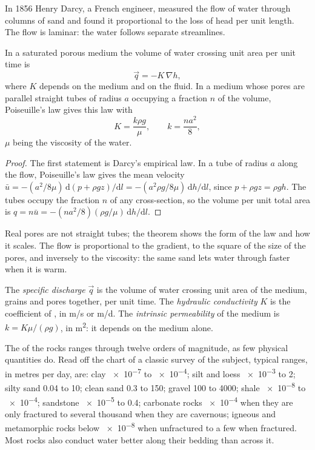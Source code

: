 In 1856 Henry Darcy, a French engineer, measured the flow of water through
columns of sand and found it proportional to the loss of head per unit
length. The flow is laminar: the water follows separate streamlines.

\begin{theorem}\label{thm:b3:hydrogeology:darcy}
In a saturated porous medium the volume of water crossing unit area per
unit time is
\[
\vec q = -K\,\nabla h ,
\]
where $K$ depends on the medium and on the fluid. In a medium whose pores
are parallel straight tubes of radius $a$ occupying a fraction $n$ of the
volume, Poiseuille's law gives this law with
\[
K = \frac{k\rho g}{\mu}, \qquad k = \frac{na^2}{8} ,
\]
$\mu$ being the viscosity of the water.
\end{theorem}

\begin{proof}
The first statement is Darcy's empirical law. In a tube of radius $a$
along the flow, Poiseuille's law gives the mean velocity $\bar u =
-(a^2/8\mu)\,\mathrm d(p + \rho gz)/\mathrm dl = -(a^2\rho g/8\mu)\,\mathrm
dh/\mathrm dl$, since $p + \rho gz = \rho g h$. The tubes occupy the
fraction $n$ of any cross-section, so the volume per unit total area is
$q = n\bar u = -(na^2/8)(\rho g/\mu)\,\mathrm dh/\mathrm dl$.
\end{proof}

Real pores are not straight tubes; the theorem shows the form of the law
and how it scales. The flow is proportional to the gradient, to the square
of the size of the pores, and inversely to the viscosity: the same sand
lets water through faster when it is warm.

\begin{definition}\label{def:b3:hydrogeology:darcy}
The \emph{specific discharge} $\vec q$ is the
volume of water crossing unit area of the medium, grains and pores
together, per unit time. The \emph{hydraulic
conductivity} $K$ is the coefficient of
, in \unit{m/s} or \unit{m/d}. The \emph{intrinsic
permeability} of the medium is $k =
K\mu/(\rho g)$, in \unit{m^2}: it depends on the medium alone.
\end{definition}

The  of the rocks ranges through twelve orders of
magnitude, as few physical quantities do. Read off the chart of a classic
survey of the subject, typical ranges, in metres per day, are: clay
\num{e-7} to \num{e-4}; silt and loess \num{e-3} to 2; silty sand 0.04 to
10; clean sand 0.3 to 150; gravel 100 to 4000; shale \num{e-8} to
\num{e-4}; sandstone \num{e-5} to 0.4; carbonate rocks \num{e-4} when they
are only fractured to several thousand when they are cavernous; igneous and
metamorphic rocks below \num{e-8} when unfractured to a few when
fractured. Most rocks also conduct water better along their bedding than
across it.

